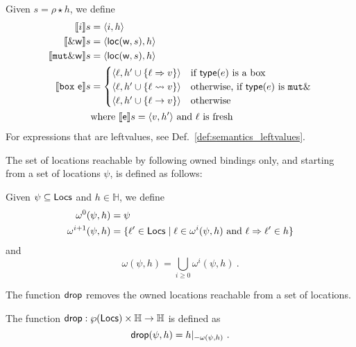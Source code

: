 \begin{definition}\label{def:semantics_expressions}
  Given $s=\rho\star h$, we define
  \begin{align*}
    \den[i]{s}&=\langle i,h\rangle\\
    \den[\borrow\mathsf{w}]{s}&=\langle\loc(\mathsf{w},s),h\rangle\\
    \den[\mathtt{mut}\borrow\mathsf{w}]{s}&=\langle\loc(\mathsf{w},s),h\rangle\\
    \den[\mathtt{box}\ \mathsf{e}]{s}&=
    \begin{cases}
      \langle\ell,h'\cup\{\ell\Rightarrow v\}\rangle & \text{if $\type(e)$ is a box}\\
      \langle\ell,h'\cup\{\ell\leadsto v\}\rangle & \text{otherwise, if $\type(e)$ is $\mathtt{mut}\borrow$}\\
      \langle\ell,h'\cup\{\ell\to v\}\rangle & \text{otherwise}
    \end{cases}\\
    & \text{where $\den[\mathsf{e}]{s}=\langle v, h'\rangle$ and $\ell$ is fresh}
  \end{align*}
  For expressions that are leftvalues, see Def.~\ref{def:semantics_leftvalues}.
\end{definition}

The set of locations reachable by following owned bindings only, and starting from a set of locations $\psi$,
is defined as follows:
%
\begin{definition}
  Given $\psi\subseteq\Locs$ and $h\in\mathbb{H}$, we define
  \begin{align*}
  \omega^0(\psi,h)&=\psi\\ %
  \omega^{i+1}(\psi,h)&=\{\ell'\in\Locs\mid\ell\in\omega^i(\psi,h)\text{ and }\ell\Rightarrow\ell'\in h\}
  \end{align*}
  and
  \[
  \omega(\psi,h)=\bigcup\limits_{i\ge 0}\omega^i(\psi,h)~.
  \]
\end{definition}

The function $\drop$ removes the owned locations reachable from a set of locations.
%
\begin{definition}[Drop]\label{def:drop}
  The function $\drop:\wp(\Locs)\times\mathbb{H}\to\mathbb{H}$ is defined as
  \[
  \drop(\psi,h)=h|_{-{\omega(\psi,h)}}~.
  \]
\end{definition}

